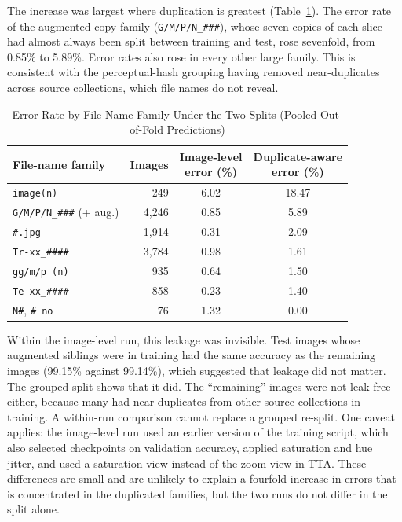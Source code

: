 \documentclass[journal,onecolumn]{IEEEtran}
\newcommand{\fname}[1]{\texttt{#1}}
\begin{document}
The increase was largest where duplication is greatest (Table~\ref{tab:errfam}). The error rate of the augmented-copy family (\fname{G/M/P/N\_\#\#\#}), whose seven copies of each slice had almost always been split between training and test, rose sevenfold, from 0.85\% to 5.89\%. Error rates also rose in every other large family. This is consistent with the perceptual-hash grouping having removed near-duplicates across source collections, which file names do not reveal.

\begin{table}[!t]
\caption{Error Rate by File-Name Family Under the Two Splits (Pooled Out-of-Fold Predictions)}
\label{tab:errfam}
\centering
\footnotesize
\setlength{\tabcolsep}{4pt}
\begin{tabular}{@{}lrcc@{}}
\toprule
File-name family & Images & \shortstack{Image-level\\error (\%)} & \shortstack{Duplicate-aware\\error (\%)} \\
\midrule
\fname{image(n)} & 249 & 6.02 & 18.47 \\
\fname{G/M/P/N\_\#\#\#} (+ aug.) & 4,246 & 0.85 & 5.89 \\
\fname{\#.jpg} & 1,914 & 0.31 & 2.09 \\
\fname{Tr-xx\_\#\#\#\#} & 3,784 & 0.98 & 1.61 \\
\fname{gg/m/p (n)} & 935 & 0.64 & 1.50 \\
\fname{Te-xx\_\#\#\#\#} & 858 & 0.23 & 1.40 \\
\fname{N\#}, \fname{\# no} & 76 & 1.32 & 0.00 \\
\bottomrule
\end{tabular}
\end{table}

Within the image-level run, this leakage was invisible. Test images whose augmented siblings were in training had the same accuracy as the remaining images (99.15\% against 99.14\%), which suggested that leakage did not matter. The grouped split shows that it did. The ``remaining'' images were not leak-free either, because many had near-duplicates from other source collections in training. A within-run comparison cannot replace a grouped re-split. One caveat applies: the image-level run used an earlier version of the training script, which also selected checkpoints on validation accuracy, applied saturation and hue jitter, and used a saturation view instead of the zoom view in TTA. These differences are small and are unlikely to explain a fourfold increase in errors that is concentrated in the duplicated families, but the two runs do not differ in the split alone.
\end{document}
